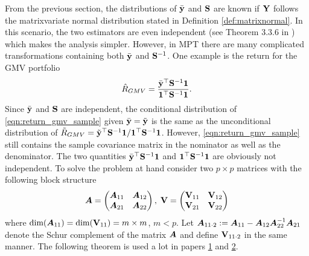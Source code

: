 \documentclass[12pt, oneside]{book}\usepackage{knitr}
\begin{document}
From the previous section, the distributions of $\bar{\mathbf{y}}$ and $\mathbf{S}$ are known if $\mathbf{Y}$ follows the matrixvariate normal distribution stated in Definition \ref{def:matrixnormal}. 
In this scenario, the two estimators are even independent (see Theorem 3.3.6 in \citet{GuptaNagar2000}) which makes the analysis simpler.
However, in MPT there are many complicated transformations containing both $\bar{\mathbf{y}}$ and $\mathbf{S}^{-1}$.
One example is the return for the GMV portfolio
\begin{equation}\label{eqn:return_gmv_sample}
\hat{R}_{GMV}=\frac{\bar{\mathbf{y}}^\top\mathbf{S}^{-1}\mathbf{1}}{\mathbf{1}^\top\mathbf{S}^{-1}\mathbf{1}}.
\end{equation}
Since $\bar{\mathbf{y}}$ and $\mathbf{S}$ are independent, the conditional distribution of \eqref{eqn:return_gmv_sample} given $\bar{\mathbf{y}}=\tilde{\mathbf{y}}$ is the same as the unconditional distribution of $\tilde{R}_{GMV} = \tilde{\mathbf{y}}^\top \mathbf{S}^{-1} \mathbf{1} / \mathbf{1}^\top \mathbf{S}^{-1} \mathbf{1}$.
However, \eqref{eqn:return_gmv_sample} still contains the sample covariance matrix in the nominator as well as the denominator.
The two quantities $\bar{\mathbf{y}}^\top\mathbf{S}^{-1}\mathbf{1}$ and $\mathbf{1}^\top\mathbf{S}^{-1}\mathbf{1}$ are obviously not independent.
To solve the problem at hand consider two $p\times p$ matrices with the following block structure 
\begin{equation}\label{eqn:blockmat}
\mbox{\boldmath$A$} = \begin{pmatrix}
       \mbox{\boldmath$A$}_{11} & \mbox{\boldmath$A$}_{12} \\
       \mbox{\boldmath$A$}_{21} & \mbox{\boldmath$A$}_{22}
      \end{pmatrix},\;
\mathbf{V} = \begin{pmatrix}
           \mathbf{V}_{11} & \mathbf{V}_{12} \\
           \mathbf{V}_{21} & \mathbf{V}_{22}
          \end{pmatrix}
\end{equation}
where $\text{dim}(\mbox{\boldmath$A$}_{11}) = \text{dim}(\mathbf{V}_{11})= m \times m$, $m<p$. 
Let $\mbox{\boldmath$A$}_{11\cdot 2} := \mbox{\boldmath$A$}_{11} - \mbox{\boldmath$A$}_{12} \mbox{\boldmath$A$}_{22}^{-1} \mbox{\boldmath$A$}_{21}$ denote the Schur complement of the matrix $\mbox{\boldmath$A$}$ and define $\mathbf{V}_{11\cdot 2}$ in the same manner. 
The following theorem is used a lot in papers \hyperref[sec:paper2]{1} and \hyperref[sec:paper2]{2}.
\end{document}
